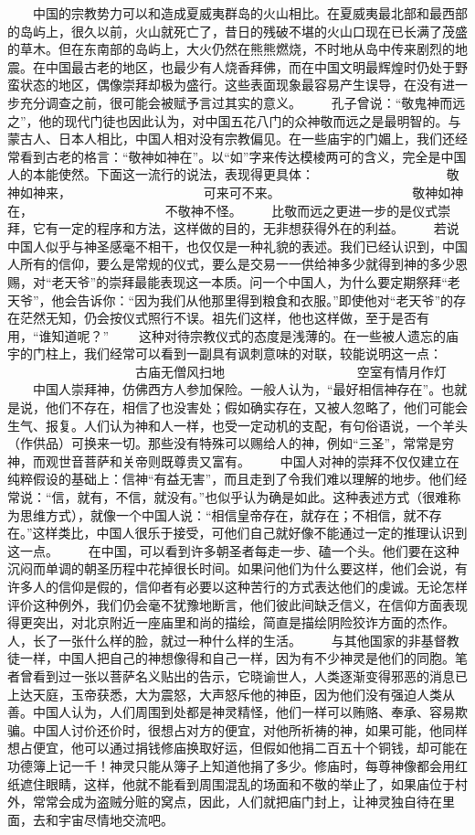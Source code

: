 \documentclass[12pt,oneside]{book}
\begin{document}
\begin{common-format}
　　中国的宗教势力可以和造成夏威夷群岛的火山相比。在夏威夷最北部和最西部的岛屿上，很久以前，火山就死亡了，昔日的残破不堪的火山口现在已长满了茂盛的草木。但在东南部的岛屿上，大火仍然在熊熊燃烧，不时地从岛中传来剧烈的地震。在中国最古老的地区，也最少有人烧香拜佛，而在中国文明最辉煌时仍处于野蛮状态的地区，偶像崇拜却极为盛行。这些表面现象最容易产生误导，在没有进一步充分调查之前，很可能会被赋予言过其实的意义。 
　　孔子曾说：“敬鬼神而远之”，他的现代门徒也因此认为，对中国五花八门的众神敬而远之是最明智的。与蒙古人、日本人相比，中国人相对没有宗教偏见。在一些庙宇的门媚上，我们还经常看到古老的格言：“敬神如神在”。以“如”字来传达模棱两可的含义，完全是中国人的本能使然。下面这一流行的说法，表现得更具体： 
　　　　　　　　　　敬神如神来， 
　　　　　　　　　　可来可不来。 
　　　　　　　　　　敬神如神在， 
　　　　　　　　　　不敬神不怪。 
　　比敬而远之更进一步的是仪式崇拜，它有一定的程序和方法，这样做的目的，无非想获得外在的利益。 
　　若说中国人似乎与神圣感毫不相干，也仅仅是一种礼貌的表述。我们已经认识到，中国人所有的信仰，要么是常规的仪式，要么是交易一一供给神多少就得到神的多少恩赐，对“老天爷”的崇拜最能表现这一本质。问一个中国人，为什么要定期祭拜“老天爷”，他会告诉你：“因为我们从他那里得到粮食和衣服。”即使他对“老天爷”的存在茫然无知，仍会按仪式照行不误。祖先们这样，他也这样做，至于是否有用，“谁知道呢？” 
　　这种对待宗教仪式的态度是浅薄的。在一些被人遗忘的庙宇的门柱上，我们经常可以看到一副具有讽刺意味的对联，较能说明这一点： 
　　　　　　　　　　古庙无僧风扫地 
　　　　　　　　　　空室有情月作灯 
　　中国人崇拜神，仿佛西方人参加保险。一般人认为，“最好相信神存在”。也就是说，他们不存在，相信了也没害处；假如确实存在，又被人忽略了，他们可能会生气、报复。人们认为神和人一样，也受一定动机的支配，有句俗语说，一个羊头（作供品）可换来一切。那些没有特殊可以赐给人的神，例如“三圣”，常常是穷神，而观世音菩萨和关帝则既尊贵又富有。 
　　中国人对神的崇拜不仅仅建立在纯粹假设的基础上：信神“有益无害”，而且走到了令我们难以理解的地步。他们经常说：“信，就有，不信，就没有。”也似乎认为确是如此。这种表述方式（很难称为思维方式），就像一个中国人说：“相信皇帝存在，就存在；不相信，就不存在。”这样类比，中国人很乐于接受，可他们自己就好像不能通过一定的推理认识到这一点。 
　　在中国，可以看到许多朝圣者每走一步、磕一个头。他们要在这种沉闷而单调的朝圣历程中花掉很长时间。如果问他们为什么要这样，他们会说，有许多人的信仰是假的，信仰者有必要以这种苦行的方式表达他们的虔诚。无论怎样评价这种例外，我们仍会毫不犹豫地断言，他们彼此间缺乏信义，在信仰方面表现得更突出，对北京附近一座庙里和尚的描绘，简直是描绘阴险狡诈方面的杰作。人，长了一张什么样的脸，就过一种什么样的生活。 
　　与其他国家的非基督教徒一样，中国人把自己的神想像得和自己一样，因为有不少神灵是他们的同胞。笔者曾看到过一张以菩萨名义贴出的告示，它晓谕世人，人类逐渐变得邪恶的消息已上达天庭，玉帝获悉，大为震怒，大声怒斥他的神臣，因为他们没有强迫人类从善。中国人认为，人们周围到处都是神灵精怪，他们一样可以贿赂、奉承、容易欺骗。中国人讨价还价时，很想占对方的便宜，对他所祈祷的神，如果可能，他同样想占便宜，他可以通过捐钱修庙换取好运，但假如他捐二百五十个铜钱，却可能在功德簿上记一千！神灵只能从簿子上知道他捐了多少。修庙时，每尊神像都会用红纸遮住眼睛，这样，他就不能看到周围混乱的场面和不敬的举止了，如果庙位于村外，常常会成为盗贼分赃的窝点，因此，人们就把庙门封上，让神灵独自待在里面，去和宇宙尽情地交流吧。 

\end{common-format}
\end{document}
